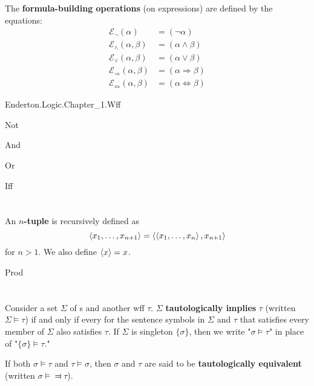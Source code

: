 \documentclass{report}
\begin{document}
  The \textbf{formula-building operations} (on expressions) are defined by the
  equations:
    \begin{align*}
      \mathcal{E}_{\neg}(\alpha)
        & = (\neg \alpha) \\
      \mathcal{E}_{\land}(\alpha, \beta)
        & = (\alpha \land \beta) \\
      \mathcal{E}_{\lor}(\alpha, \beta)
        & = (\alpha \lor \beta) \\
      \mathcal{E}_{\Rightarrow}(\alpha, \beta)
        & = (\alpha \Rightarrow \beta) \\
      \mathcal{E}_{\Leftrightarrow}(\alpha, \beta)
        & = (\alpha \Leftrightarrow \beta)
    \end{align*}

    {Enderton.Logic.Chapter\_1.Wff}

    {Not}

    {And}

    {Or}

    {Iff}

\section{}%

  An \textbf{$n$-tuple} is recursively defined as
    $$\left< x_1, \ldots, x_{n+1} \right> = \left< \left< x_1, \ldots, x_n \right>, x_{n+1} \right>$$
    for $n > 1$.
  We also define $\left< x \right> = x$.

    {Prod}

\section{}%

  Consider a set $\Sigma$ of s and another wff
    $\tau$.
  $\Sigma$ \textbf{tautologically implies} $\tau$ (written $\Sigma \vDash \tau$)
    if and only if every  for the sentence symbols
    in $\Sigma$ and $\tau$ that satisfies every member of $\Sigma$ also
    satisfies $\tau$.
  If $\Sigma$ is singleton $\{\sigma\}$, then we write "$\sigma \vDash \tau$" in
    place of "$\{\sigma\} \vDash \tau$."

  If both $\sigma \vDash \tau$ and $\tau \vDash \sigma$, then $\sigma$ and
    $\tau$ are said to be \textbf{tautologically equivalent} (written
    $\sigma \vDash \Dashv \tau$).
\end{document}

